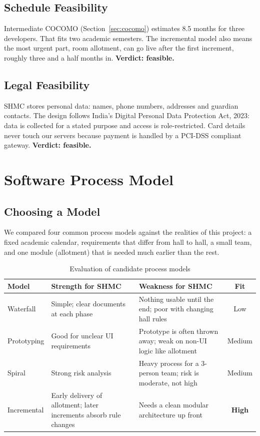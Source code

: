 \documentclass[11pt,a4paper]{report}
\begin{document}
\section{Schedule Feasibility}
Intermediate COCOMO (Section~\ref{sec:cocomo}) estimates 8.5 months for three developers. That fits two academic semesters. The incremental model also means the most urgent part, room allotment, can go live after the first increment, roughly three and a half months in. \textbf{Verdict: feasible.}

\section{Legal Feasibility}
SHMC stores personal data: names, phone numbers, addresses and guardian contacts. The design follows India's Digital Personal Data Protection Act, 2023: data is collected for a stated purpose and access is role-restricted. Card details never touch our servers because payment is handled by a PCI-DSS compliant gateway. \textbf{Verdict: feasible.}
\chapter{Software Process Model}

\section{Choosing a Model}
We compared four common process models against the realities of this project: a fixed academic calendar, requirements that differ from hall to hall, a small team, and one module (allotment) that is needed much earlier than the rest.

\begin{table}[H]
\centering\small
\caption{Evaluation of candidate process models}\label{tab:models}
\begin{tabularx}{\textwidth}{lLLc}
\toprule
\textbf{Model} & \textbf{Strength for SHMC} & \textbf{Weakness for SHMC} & \textbf{Fit}\\
\midrule
Waterfall & Simple; clear documents at each phase & Nothing usable until the end; poor with changing hall rules & Low\\
Prototyping & Good for unclear UI requirements & Prototype is often thrown away; weak on non-UI logic like allotment & Medium\\
Spiral & Strong risk analysis & Heavy process for a 3-person team; risk is moderate, not high & Medium\\
Incremental & Early delivery of allotment; later increments absorb rule changes & Needs a clean modular architecture up front & \textbf{High}\\
\bottomrule
\end{tabularx}
\end{table}
\end{document}
